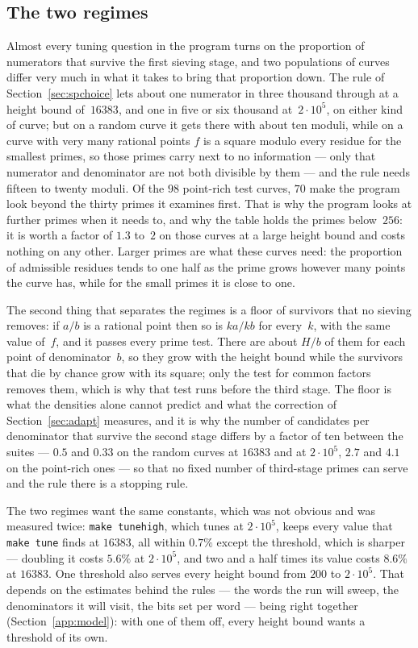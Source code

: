 \documentclass[12pt,a4paper,oneside]{amsart}
\begin{document}
\subsection{The two regimes}\label{app:regimes}

Almost every tuning question in the program turns on the proportion of
numerators that survive the first sieving stage, and two populations of
curves differ very much in what it takes to bring that proportion down. The
rule of Section~\ref{sec:spchoice} lets about one numerator in three
thousand through at a height bound of~$16383$, and one in five or six
thousand at~$2\cdot10^5$, on either kind of curve; but on a random curve it
gets there with about ten moduli, while on a curve with very many rational
points $f$ is a square modulo every residue for the smallest primes, so
those primes carry next to no information --- only that numerator and
denominator are not both divisible by them --- and the rule needs
fifteen to twenty moduli. Of the $98$ point-rich test curves, $70$ make the
program look beyond the thirty primes it examines first. That is
why the program looks at further primes when it needs to, and why the table
holds the primes below~$256$: it is worth a factor of $1.3$ to~$2$ on those
curves at a large height bound and costs nothing on any other. Larger
primes are what these curves need: the proportion of admissible residues
tends to one half as the prime grows however many points the curve has,
while for the small primes it is close to one.

The second thing that separates the regimes is a floor of survivors that
no sieving removes: if $a/b$ is a rational point then so is $ka/kb$ for
every~$k$, with the same value of~$f$, and it passes every prime test. There
are about $H/b$ of them for each point of denominator~$b$, so they grow
with the height bound while the survivors that die by chance grow with its
square; only the test for common factors removes them, which is why that
test runs before the third stage. The floor is what the densities alone
cannot predict and what the correction of Section~\ref{sec:adapt} measures,
and it is why the number of candidates per denominator that survive the
second stage differs by a factor of ten between the suites --- $0.5$ and
$0.33$ on the random curves at $16383$ and at $2\cdot10^5$, $2.7$ and $4.1$
on the point-rich ones --- so that no fixed number of third-stage primes can
serve and the rule there is a stopping rule.

The two regimes want the same constants, which was not obvious and was
measured twice: \texttt{make tunehigh}, which tunes at $2\cdot10^5$, keeps
every value that \texttt{make tune} finds at $16383$, all within $0.7\%$
except the threshold, which is sharper --- doubling it costs $5.6\%$ at
$2\cdot10^5$, and two and a half times its value costs $8.6\%$ at $16383$.
One threshold also serves every height bound from $200$ to $2\cdot10^5$.
That depends on the estimates behind the rules --- the words the run will
sweep, the denominators it will visit, the bits set per word --- being right
together (Section~\ref{app:model}): with one of them off, every height
bound wants a threshold of its own.
\end{document}
